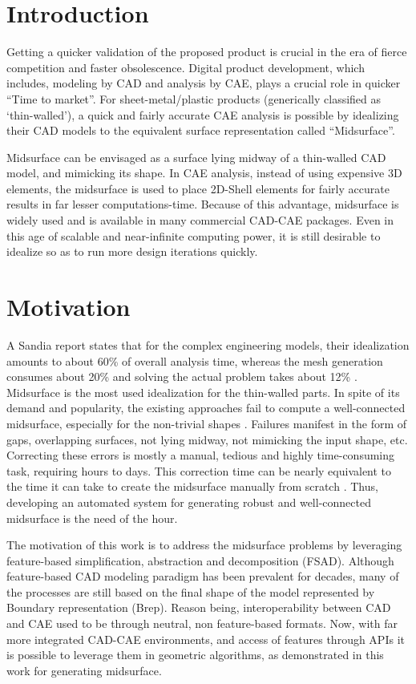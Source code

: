 \section{Introduction}\label{sec:intro}

Getting a quicker validation of the proposed product is crucial in the era of fierce competition and faster obsolescence. Digital product development, which includes, modeling by CAD and analysis by CAE, plays a crucial role in quicker ``Time to market''.  For sheet-metal/plastic products (generically classified as `thin-walled'),  a quick and fairly accurate CAE analysis is possible by idealizing their CAD models to the equivalent surface representation called ``Midsurface''.  

Midsurface can be envisaged as a surface lying midway of a thin-walled CAD model, and mimicking its shape. In CAE analysis, instead of using expensive 3D elements, the midsurface is used to place 2D-Shell elements for fairly accurate results in far lesser computations-time. Because of this advantage, midsurface is widely used and is available in many commercial CAD-CAE packages.  Even in this age of scalable and near-infinite computing power, it is still desirable to idealize so as to run more design iterations quickly. 

\section{Motivation}\label{sec:motivation}
A Sandia report states that for the complex engineering models, their idealization amounts to about 60\% of overall analysis time, whereas the mesh generation consumes about 20\% and solving the actual problem takes about 12\% \cite{Ming2012}. Midsurface is the most used idealization for the thin-walled parts. In spite of its demand and popularity, the existing approaches fail to compute a well-connected midsurface, especially for the non-trivial shapes \cite{ Robinson2006, Lockett2008, Woo2013}. Failures manifest in the form of gaps, overlapping surfaces, not lying midway, not mimicking the input shape, etc. Correcting these errors is mostly a manual, tedious and highly time-consuming task, requiring hours to days. This correction time can be nearly equivalent to the time it can take to create the midsurface manually from scratch \cite{Stolt2006}.  Thus, developing an automated system for generating robust and well-connected midsurface is the need of the hour.

The motivation of this work  is to address the midsurface problems by leveraging feature-based simplification, abstraction and decomposition (FSAD). Although feature-based CAD modeling paradigm has been prevalent for decades, many of the processes are still based on the final shape of the model represented by Boundary representation (Brep). Reason being, interoperability between CAD and CAE used to be through neutral, non feature-based formats. Now, with far more integrated CAD-CAE environments, and access of features through APIs it is possible to leverage them in geometric algorithms, as demonstrated in this work for generating midsurface.



